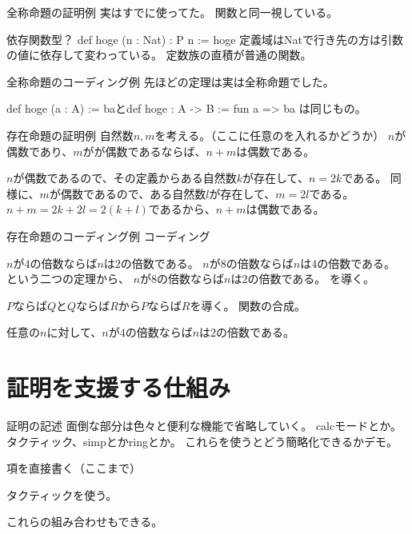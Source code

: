 \documentclass[unicode,12pt]{beamer}%
\begin{document}
\begin{frame}{全称命題の証明例}
  実はすでに使ってた。
  関数と同一視している。

  依存関数型？
  def hoge (n : Nat) : P n := hoge
  定義域はNatで行き先の方は引数の値に依存して変わっている。
  定数族の直積が普通の関数。
\end{frame}

\begin{frame}{全称命題のコーディング例}
  先ほどの定理は実は全称命題でした。

  def hoge (a : A) := baとdef hoge : A -> B := fun a => ba は同じもの。
\end{frame}

\begin{frame}{存在命題の証明例}
  自然数$n, m$を考える。（ここに任意のを入れるかどうか）
  $n$が偶数であり、$m$がが偶数であるならば、$n+m$は偶数である。

  $n$が偶数であるので、その定義からある自然数$k$が存在して、$n=2k$である。
  同様に、$m$が偶数であるので、ある自然数$l$が存在して、$m=2l$である。
  $n+m=2k+2l=2(k+l)$であるから、$n+m$は偶数である。
\end{frame}

\begin{frame}{存在命題のコーディング例}
  コーディング
\end{frame}

\begin{frame}
  $n$が$4$の倍数ならば$n$は$2$の倍数である。
  $n$が$8$の倍数ならば$n$は$4$の倍数である。
  という二つの定理から、
  $n$が$8$の倍数ならば$n$は$2$の倍数である。
  を導く。

  $P$ならば$Q$と$Q$ならば$R$から$P$ならば$R$を導く。
  関数の合成。

  任意の$n$に対して、$n$が$4$の倍数ならば$n$は$2$の倍数である。  
\end{frame}

\section{証明を支援する仕組み}

\begin{frame}{証明の記述}
  面倒な部分は色々と便利な機能で省略していく。
  calcモードとか。
  タクティック、simpとかringとか。
  これらを使うとどう簡略化できるかデモ。

  項を直接書く（ここまで）

  タクティックを使う。

  これらの組み合わせもできる。
\end{frame}
\end{document}
